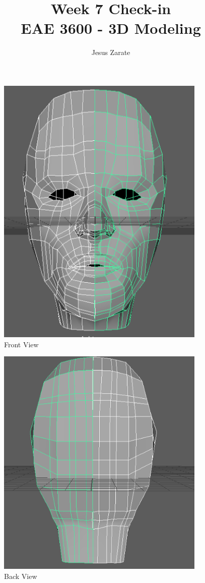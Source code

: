 \documentclass[a4paper]{article}
\title{
  Week 7 Check-in\\
  \large EAE 3600 - 3D Modeling}
\author{Jesus Zarate}
\begin{document}
\maketitle


\begin{figure}[h]
\centering
\includegraphics[width=10cm]{img/Front.png}
\caption{Front View}
\label{fig:Front View}
\end{figure}

\begin{figure}[h]
\centering
\includegraphics[width=10cm]{img/Back.png}
\caption{Back View}
\label{fig:Angle View}
\end{figure}
\end{document}
